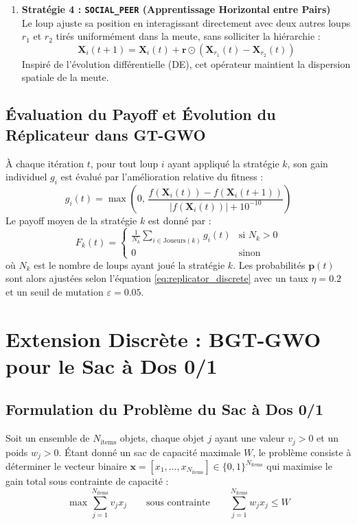 \begin{enumerate}[label=\textbf{\arabic*.}]
    \item \textbf{Stratégie 4 : \texttt{SOCIAL\_PEER} (Apprentissage Horizontal entre Pairs)} \\
    Le loup ajuste sa position en interagissant directement avec deux autres loups $r_1$ et $r_2$ tirés uniformément dans la meute, sans solliciter la hiérarchie :
    \begin{equation}
        \mathbf{X}_i(t+1) = \mathbf{X}_i(t) + \mathbf{r} \odot \left(\mathbf{X}_{r_1}(t) - \mathbf{X}_{r_2}(t)\right)
    \end{equation}
    Inspiré de l'évolution différentielle (DE), cet opérateur maintient la dispersion spatiale de la meute.
\end{enumerate}

\subsection{Évaluation du Payoff et Évolution du Réplicateur dans GT-GWO}
À chaque itération $t$, pour tout loup $i$ ayant appliqué la stratégie $k$, son gain individuel $g_i$ est évalué par l'amélioration relative du fitness :
\begin{equation}
    g_i(t) = \max\left(0,\, \frac{f(\mathbf{X}_i(t)) - f(\mathbf{X}_i(t+1))}{|f(\mathbf{X}_i(t))| + 10^{-10}}\right)
\end{equation}
Le payoff moyen de la stratégie $k$ est donné par :
\begin{equation}
    F_k(t) = 
    \begin{cases}
        \frac{1}{N_k} \sum_{i \in \text{Joueurs}(k)} g_i(t) & \text{si } N_k > 0 \\
        0 & \text{sinon}
    \end{cases}
\end{equation}
où $N_k$ est le nombre de loups ayant joué la stratégie $k$. Les probabilités $\mathbf{p}(t)$ sont alors ajustées selon l'équation \eqref{eq:replicator_discrete} avec un taux $\eta = 0.2$ et un seuil de mutation $\varepsilon = 0.05$.

\section{Extension Discrète : BGT-GWO pour le Sac à Dos 0/1}

\subsection{Formulation du Problème du Sac à Dos 0/1}
Soit un ensemble de $N_{\text{items}}$ objets, chaque objet $j$ ayant une valeur $v_j > 0$ et un poids $w_j > 0$. Étant donné un sac de capacité maximale $W$, le problème consiste à déterminer le vecteur binaire $\mathbf{x} = [x_1, \dots, x_{N_{\text{items}}}] \in \{0, 1\}^{N_{\text{items}}}$ qui maximise le gain total sous contrainte de capacité :
\begin{equation}
    \max \sum_{j=1}^{N_{\text{items}}} v_j x_j \qquad \text{sous contrainte} \qquad \sum_{j=1}^{N_{\text{items}}} w_j x_j \le W
\end{equation}

